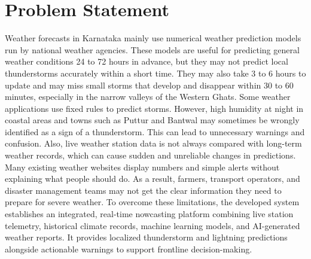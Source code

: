 \documentclass[12pt,a4paper]{report}
\begin{document}
\section{Problem Statement}
Weather forecasts in Karnataka mainly use numerical weather prediction models run by national weather agencies. These models are useful for predicting general weather conditions 24 to 72 hours in advance, but they may not predict local thunderstorms accurately within a short time. They may also take 3 to 6 hours to update and may miss small storms that develop and disappear within 30 to 60 minutes, especially in the narrow valleys of the Western Ghats.
Some weather applications use fixed rules to predict storms. However, high humidity at night in coastal areas and towns such as Puttur and Bantwal may sometimes be wrongly identified as a sign of a thunderstorm. This can lead to unnecessary warnings and confusion. Also, live weather station data is not always compared with long-term weather records, which can cause sudden and unreliable changes in predictions.
Many existing weather websites display numbers and simple alerts without explaining what people should do. As a result, farmers, transport operators, and disaster management teams may not get the clear information they need to prepare for severe weather.
To overcome these limitations, the developed system establishes an integrated, real-time nowcasting platform combining live station telemetry, historical climate records, machine learning models, and AI-generated weather reports. It provides localized thunderstorm and lightning predictions alongside actionable warnings to support frontline decision-making.
\end{document}
